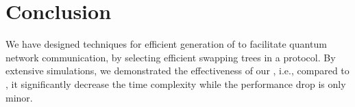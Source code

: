 \section{Conclusion}
\label{sec:swapping_conc}

We have designed techniques for efficient generation of \eps to facilitate quantum
network communication, by selecting efficient swapping trees in a \wt protocol.
By extensive simulations, we demonstrated the effectiveness of our \dpalt, i.e., compared to \dpa, it significantly decrease the time complexity
while the performance drop is only minor.

